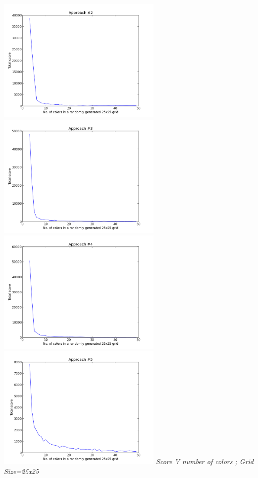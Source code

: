 \documentclass[twoside]{article}
\begin{document}
\begin{multicols}{2}
\includegraphics[width=8cm]{figure_2.png}
\includegraphics[width=8cm]{figure_1.png}
\includegraphics[width=8cm]{figure_4.png}
\includegraphics[width=8cm]{figure_5.png}
\emph{Score V number of colors ; Grid Size=25x25}\\


\end{multicols}
\end{document}
